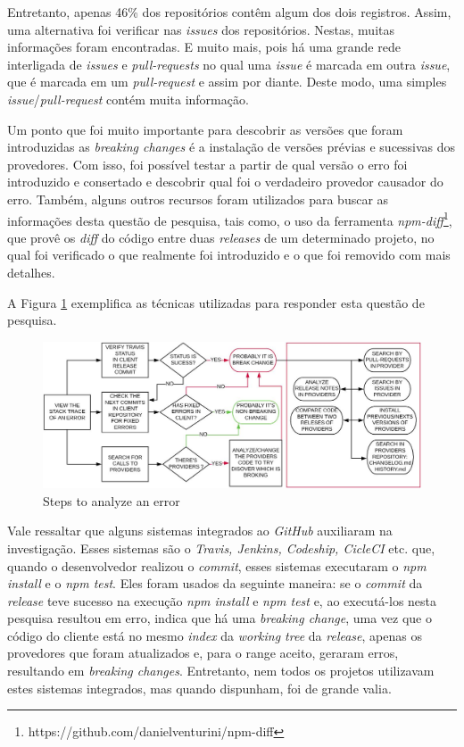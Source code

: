 Entretanto, apenas 46\% dos repositórios contêm algum dos dois registros. Assim, uma alternativa foi verificar nas \textit{issues} dos repositórios. Nestas, muitas informações foram encontradas. E muito mais, pois há uma grande rede interligada de \textit{issues} e \textit{pull-requests} no qual uma \textit{issue} é marcada em outra \textit{issue}, que é marcada em um \textit{pull-request} e assim por diante. Deste modo, uma simples \textit{issue}/\textit{pull-request} contém muita informação.

Um ponto que foi muito importante para descobrir as versões que foram introduzidas as \textit{breaking changes} é a instalação de versões prévias e sucessivas dos provedores. Com isso, foi possível testar a partir de qual versão o erro foi introduzido e consertado e descobrir qual foi o verdadeiro provedor causador do erro. Também, alguns outros recursos foram utilizados para buscar as informações desta questão de pesquisa, tais como, o uso da ferramenta \textit{npm-diff}\footnote{https://github.com/danielventurini/npm-diff}, que provê os \textit{diff} do código entre duas \textit{releases} de um determinado projeto, no qual foi verificado o que realmente foi introduzido e o que foi removido com mais detalhes.

A Figura \ref{fig:step_analyze} exemplifica as técnicas utilizadas para responder esta questão de pesquisa.

\begin{figure}
    \centering
    \includegraphics[scale=0.35]{figuras/step_analyze.jpeg}
    \caption{Steps to analyze an error}
    \label{fig:step_analyze}
\end{figure}

Vale ressaltar que alguns sistemas integrados ao \textit{GitHub} auxiliaram na investigação. Esses sistemas são o \textit{Travis, Jenkins, Codeship, CicleCI} etc. que, quando o desenvolvedor realizou o \textit{commit}, esses sistemas executaram o \textit{npm install} e o \textit{npm test}. Eles foram usados da seguinte maneira: se o \textit{commit} da \textit{release} teve sucesso na execução \textit{npm install} e \textit{npm test} e, ao executá-los nesta pesquisa resultou em erro, indica que há uma \textit{breaking change}, uma vez que o código do cliente está no mesmo \textit{index} da \textit{working tree} da \textit{release}, apenas os provedores que foram atualizados e, para o range aceito, geraram erros, resultando em \textit{breaking changes}. Entretanto, nem todos os projetos utilizavam estes sistemas integrados, mas quando dispunham, foi de grande valia.

